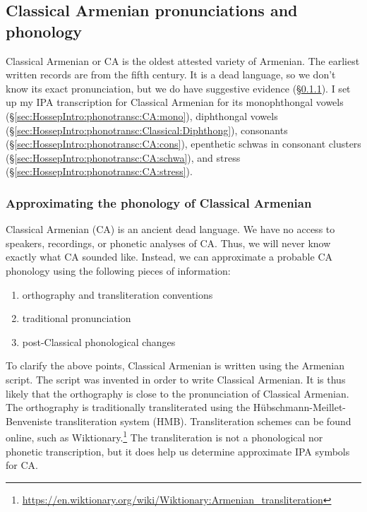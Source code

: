 \subsection{Classical Armenian pronunciations and phonology}\label{sec:HossepIntro:phonotransc:CA}

Classical Armenian or CA is the oldest attested variety of Armenian. The earliest written records are from the fifth century. It is a dead language, so we don't know its exact pronunciation, but we do have suggestive evidence (\S\ref{sec:HossepIntro:phonotransc:CA:approx}).  I set up my IPA transcription for  Classical Armenian for its monophthongal vowels (\S\ref{sec:HossepIntro:phonotransc:CA:mono}), diphthongal vowels (\S\ref{sec:HossepIntro:phonotransc:Classical:Diphthong}), consonants (\S\ref{sec:HossepIntro:phonotransc:CA:cons}), epenthetic schwas in consonant clusters (\S\ref{sec:HossepIntro:phonotransc:CA:schwa}), and stress (\S\ref{sec:HossepIntro:phonotransc:CA:stress}). 

 

\subsubsection{Approximating   the phonology of Classical Armenian}\label{sec:HossepIntro:phonotransc:CA:approx}
Classical Armenian (CA) is an ancient dead language. We have no access to speakers, recordings, or phonetic analyses of CA. Thus, we will never know exactly what CA sounded like. Instead, we can approximate a probable CA phonology using the following pieces of information:
\begin{enumerate}
	\item orthography and transliteration conventions
		\item traditional pronunciation
\item post-Classical phonological changes
\end{enumerate}

To clarify the above points, Classical Armenian is written using the Armenian script. The script was invented in order to write Classical Armenian. It is thus likely that the orthography is close to the pronunciation of Classical Armenian. The orthography is traditionally transliterated using the Hübschmann-Meillet-Benveniste transliteration system (HMB). Transliteration schemes can be found online, such as Wiktionary.\footnote{\url{https://en.wiktionary.org/wiki/Wiktionary:Armenian_transliteration}} The transliteration is not a phonological nor phonetic transcription, but it does help us determine approximate IPA symbols for CA. 

